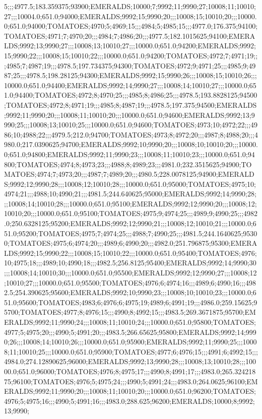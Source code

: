 5;;;4977.5;183.359375;93900;EMERALDS;10000;7;9992;11;9990;27;10008;11;10010;27;;;10004.0;651.0;94000;EMERALDS;9992;15;9990;20;;;10008;15;10010;20;;;10000.0;651.0;94000;TOMATOES;4970;5;4969;15;;;4984;5;4985;15;;;4977.0;176.375;94100;TOMATOES;4971;7;4970;20;;;4984;7;4986;20;;;4977.5;182.1015625;94100;EMERALDS;9992;13;9990;27;;;10008;13;10010;27;;;10000.0;651.0;94200;EMERALDS;9992;15;9990;22;;;10008;15;10010;22;;;10000.0;651.0;94200;TOMATOES;4972;7;4971;19;;;4985;7;4987;19;;;4978.5;197.734375;94300;TOMATOES;4972;9;4971;25;;;4985;9;4987;25;;;4978.5;198.28125;94300;EMERALDS;9992;15;9990;26;;;10008;15;10010;26;;;10000.0;651.0;94400;EMERALDS;9992;14;9990;27;;;10008;14;10010;27;;;10000.0;651.0;94400;TOMATOES;4972;8;4970;25;;;4985;8;4986;25;;;4978.5;193.8828125;94500;TOMATOES;4972;8;4971;19;;;4985;8;4987;19;;;4978.5;197.375;94500;EMERALDS;9992;11;9990;20;;;10008;11;10010;20;;;10000.0;651.0;94600;EMERALDS;9992;13;9990;25;;;10008;13;10010;25;;;10000.0;651.0;94600;TOMATOES;4973;10;4972;22;;;4986;10;4988;22;;;4979.5;212.0;94700;TOMATOES;4973;8;4972;20;;;4987;8;4988;20;;;4980.0;217.0390625;94700;EMERALDS;9992;10;9990;20;;;10008;10;10010;20;;;10000.0;651.0;94800;EMERALDS;9992;11;9990;23;;;10008;11;10010;23;;;10000.0;651.0;94800;TOMATOES;4974;8;4973;23;;;4988;8;4989;23;;;4981.0;232.3515625;94900;TOMATOES;4974;7;4973;20;;;4987;7;4989;20;;;4980.5;228.0078125;94900;EMERALDS;9992;12;9990;28;;;10008;12;10010;28;;;10000.0;651.0;95000;TOMATOES;4975;10;4974;21;;;4988;10;4990;21;;;4981.5;244.640625;95000;EMERALDS;9992;14;9990;28;;;10008;14;10010;28;;;10000.0;651.0;95100;EMERALDS;9992;12;9990;20;;;10008;12;10010;20;;;10000.0;651.0;95100;TOMATOES;4975;9;4974;25;;;4989;9;4990;25;;;4982.0;250.6328125;95200;EMERALDS;9992;12;9990;21;;;10008;12;10010;21;;;10000.0;651.0;95200;TOMATOES;4975;7;4974;25;;;4988;7;4990;25;;;4981.5;244.1640625;95300;TOMATOES;4975;6;4974;20;;;4989;6;4990;20;;;4982.0;251.796875;95300;EMERALDS;9992;15;9990;22;;;10008;15;10010;22;;;10000.0;651.0;95400;TOMATOES;4976;10;4975;18;;;4989;10;4990;18;;;4982.5;256.8125;95400;EMERALDS;9992;14;9990;30;;;10008;14;10010;30;;;10000.0;651.0;95500;EMERALDS;9992;12;9990;27;;;10008;12;10010;27;;;10000.0;651.0;95500;TOMATOES;4976;6;4974;16;;;4989;6;4990;16;;;4982.5;254.390625;95600;EMERALDS;9992;10;9990;23;;;10008;10;10010;23;;;10000.0;651.0;95600;TOMATOES;4983;6;4976;6;4975;19;4989;6;4991;19;;;4986.0;259.15625;95700;TOMATOES;4977;8;4976;15;;;4990;8;4992;15;;;4983.5;269.3671875;95700;EMERALDS;9992;11;9990;24;;;10008;11;10010;24;;;10000.0;651.0;95800;TOMATOES;4977;5;4975;20;;;4990;5;4991;20;;;4983.5;266.65625;95800;EMERALDS;9992;14;9990;26;;;10008;14;10010;26;;;10000.0;651.0;95900;EMERALDS;9992;11;9990;25;;;10008;11;10010;25;;;10000.0;651.0;95900;TOMATOES;4977;6;4976;15;;;4991;6;4992;15;;;4984.0;274.12890625;96000;EMERALDS;9992;13;9990;28;;;10008;13;10010;28;;;10000.0;651.0;96000;TOMATOES;4976;8;4975;17;;;4990;8;4991;17;;;4983.0;265.32421875;96100;TOMATOES;4976;5;4975;24;;;4990;5;4991;24;;;4983.0;264.0625;96100;EMERALDS;9992;11;9990;20;;;10008;11;10010;20;;;10000.0;651.0;96200;TOMATOES;4976;5;4975;16;;;4990;5;4991;16;;;4983.0;288.625;96200;EMERALDS;10000;8;9992;13;9990;